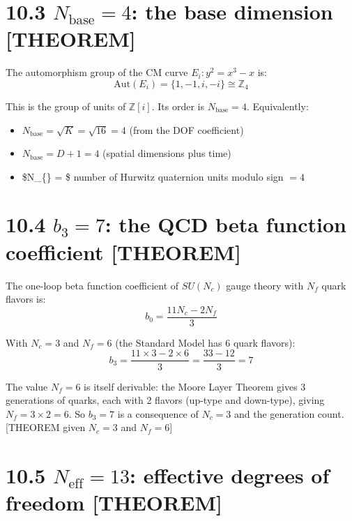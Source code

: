 \documentclass[
  11pt,
  letterpaper,
  twoside,
  openright]{book}
\providecommand{\tightlist}{%
  \setlength{\itemsep}{0pt}\setlength{\parskip}{0pt}}
\begin{document}
\section{\texorpdfstring{10.3 \(N_{\text{base}} = 4\): the base
dimension
{[}THEOREM{]}}{10.3 N\_\{\textbackslash text\{base\}\} = 4: the base dimension {[}THEOREM{]}}}\label{n_textbase-4-the-base-dimension-theorem}

The automorphism group of the CM curve \(E_i: y^2 = x^3 - x\) is: \[
\text{Aut}(E_i) = \{1, -1, i, -i\} \cong \mathbb{Z}_4
\]

This is the group of units of \(\mathbb{Z}[i]\). Its order is
\(N_{\text{base}} = 4\). Equivalently:

\begin{itemize}
\tightlist
\item
  \(N_{\text{base}} = \sqrt{K} = \sqrt{16} = 4\) (from the DOF
  coefficient)
\item
  \(N_{\text{base}} = D + 1 = 4\) (spatial dimensions plus time)
\item
  \$N\_\{\} = \$ number of Hurwitz quaternion units modulo
  sign \(= 4\)
\end{itemize}

\section{\texorpdfstring{10.4 \(b_3 = 7\): the QCD beta function
coefficient
{[}THEOREM{]}}{10.4 b\_3 = 7: the QCD beta function coefficient {[}THEOREM{]}}}\label{b_3-7-the-qcd-beta-function-coefficient-theorem}

The one-loop beta function coefficient of \(SU(N_c)\) gauge theory with
\(N_f\) quark flavors is: \[
b_0 = \frac{11N_c - 2N_f}{3}
\]

With \(N_c = 3\) and \(N_f = 6\) (the Standard Model has 6 quark
flavors): \[
b_3 = \frac{11 \times 3 - 2 \times 6}{3} = \frac{33 - 12}{3} = 7
\]

The value \(N_f = 6\) is itself derivable: the Moore Layer Theorem gives
3 generations of quarks, each with 2 flavors (up-type and down-type),
giving \(N_f = 3 \times 2 = 6\). So \(b_3 = 7\) is a consequence of
\(N_c = 3\) and the generation count. {[}THEOREM given \(N_c = 3\) and
\(N_f = 6\){]}

\section{\texorpdfstring{10.5 \(N_{\text{eff}} = 13\): effective degrees
of freedom
{[}THEOREM{]}}{10.5 N\_\{\textbackslash text\{eff\}\} = 13: effective degrees of freedom {[}THEOREM{]}}}\label{n_texteff-13-effective-degrees-of-freedom-theorem}
\end{document}
